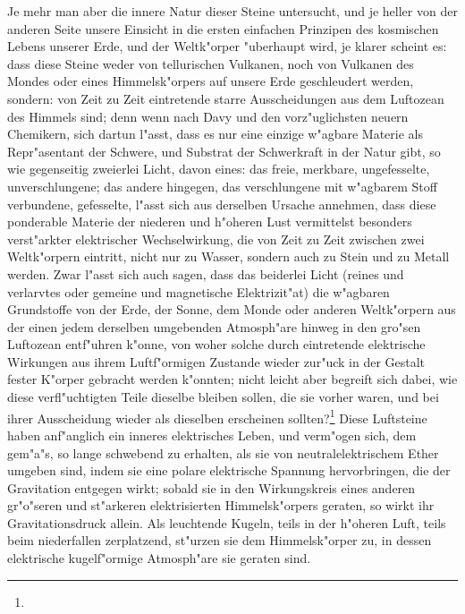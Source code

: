 \documentclass[a4paper, 11pt, oneside, polutonikogreek, german]{article}
\begin{document}
Je mehr man aber die innere Natur dieser Steine untersucht, und je heller von der anderen Seite unsere Einsicht in die ersten einfachen Prinzipen des kosmischen Lebens unserer Erde, und der Weltk"orper "uberhaupt wird, je klarer scheint es: dass diese Steine weder von tellurischen Vulkanen, noch von Vulkanen des Mondes oder eines Himmelsk"orpers auf unsere Erde geschleudert werden, sondern: von Zeit zu Zeit eintretende starre Ausscheidungen aus dem Luftozean des Himmels sind; denn wenn nach Davy und den vorz"uglichsten neuern Chemikern, sich dartun l"asst, dass es nur eine einzige w"agbare Materie als Repr"asentant der Schwere, und Substrat der Schwerkraft in der Natur gibt, so wie gegenseitig zweierlei Licht, davon eines: das freie, merkbare, ungefesselte, unverschlungene; das andere hingegen, das verschlungene mit w"agbarem Stoff verbundene, gefesselte, l"asst sich aus derselben Ursache annehmen, dass diese ponderable Materie der niederen und h"oheren Lust vermittelst besonders verst"arkter elektrischer Wechselwirkung, die von Zeit zu Zeit zwischen zwei Weltk"orpern eintritt, nicht nur zu Wasser, sondern auch zu Stein und zu Metall werden. Zwar l"asst sich auch sagen, dass das beiderlei Licht (reines und verlarvtes oder gemeine und magnetische Elektrizit"at) die w"agbaren Grundstoffe von der Erde, der Sonne, dem Monde oder anderen Weltk"orpern aus der einen jedem derselben umgebenden Atmosph"are hinweg in den gro"sen Luftozean entf"uhren k"onne, von woher solche durch eintretende elektrische Wirkungen aus ihrem Luftf"ormigen Zustande wieder zur"uck in der Gestalt fester K"orper gebracht werden k"onnten; nicht leicht aber begreift sich dabei, wie diese verfl"uchtigten Teile dieselbe bleiben sollen, die sie vorher waren, und bei ihrer Ausscheidung wieder als dieselben erscheinen sollten?\footnote{} Diese Luftsteine haben anf"anglich ein inneres elektrisches Leben, und verm"ogen sich, dem gem"a"s, so lange schwebend zu erhalten, als sie von neutralelektrischem Ether umgeben sind, indem sie eine polare elektrische Spannung hervorbringen, die der Gravitation entgegen wirkt; sobald sie in den Wirkungskreis eines anderen gr"o"seren und st"arkeren elektrisierten Himmelsk"orpers geraten, so wirkt ihr Gravitationsdruck allein. Als leuchtende Kugeln, teils in der h"oheren Luft, teils beim niederfallen zerplatzend, st"urzen sie dem Himmelsk"orper zu, in dessen elektrische kugelf"ormige Atmosph"are sie geraten sind.
\end{document}
